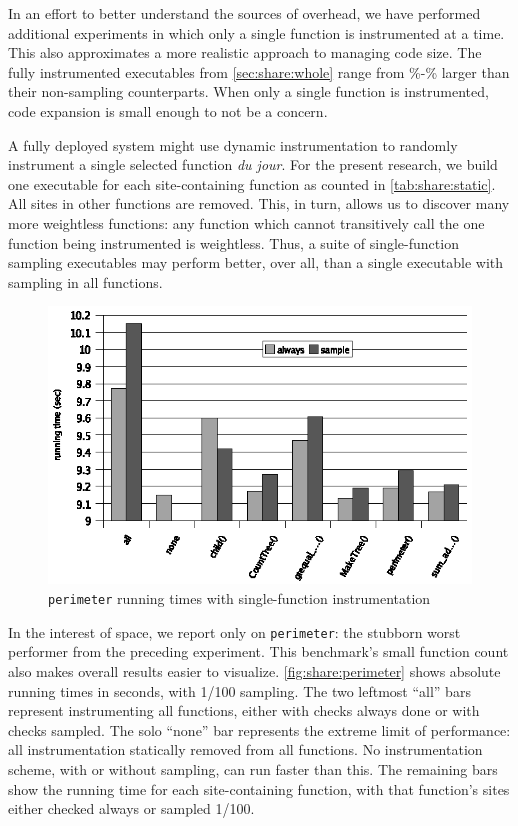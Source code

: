 In an effort to better understand the sources of overhead, we have
performed additional experiments in which only a single function is
instrumented at a time.  This also approximates a more realistic
approach to managing code size.  The fully instrumented executables
from \autoref{sec:share:whole} range from
\execGrowthMin\%-\execGrowthMax\% larger than their non-sampling
counterparts.  When only a single function is instrumented, code
expansion is small enough to not be a concern.

A fully deployed system might use dynamic instrumentation to randomly
instrument a single selected function \textit{du jour}.  For the
present research, we build one executable for each site-containing
function as counted in \autoref{tab:share:static}.  All sites in other
functions are removed.  This, in turn, allows us to discover many more
weightless functions: any function which cannot transitively call the
one function being instrumented is weightless.  Thus, a suite of
single-function sampling executables may perform better, over all,
than a single executable with sampling in all functions.

\begin{figure}
  \centering
  \includegraphics[width=\columnwidth]{applications/perimeter}
  \caption{\texttt{perimeter} running times with single-function
    instrumentation}
  \label{fig:share:perimeter}
\end{figure}

In the interest of space, we report only on \texttt{perimeter}: the
stubborn worst performer from the preceding experiment.  This
benchmark's small function count also makes overall results easier to
visualize.  \autoref{fig:share:perimeter} shows absolute running times
in seconds, with 1/100 sampling.  The two leftmost ``all'' bars
represent instrumenting all functions, either with checks always done
or with checks sampled.  The solo ``none'' bar represents the extreme
limit of performance: all instrumentation statically removed from all
functions.  No instrumentation scheme, with or without sampling, can
run faster than this.  The remaining bars show the running time for
each site-containing function, with that function's sites either
checked always or sampled 1/100.

